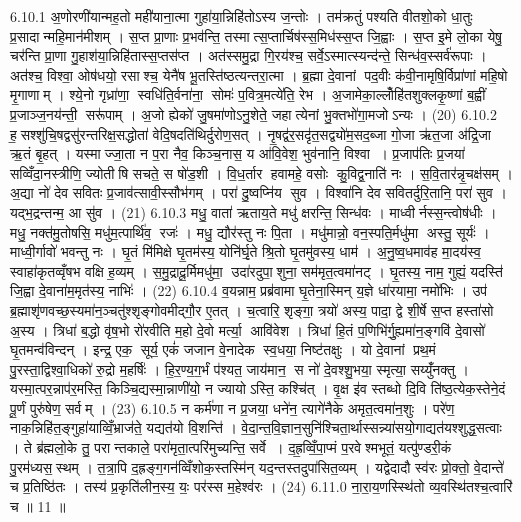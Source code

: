6.10.1
अ॒णोरणी॑यान्मह॒तो मही॑याना॒त्मा गुहा॑या॒न्निहि॑तोऽस्य ज॒न्तोः । तम॑क्रतुं पश्यति वीतशो॒को धा॒तुः प्र॒सादान्महि॒मान॑मीशम् । स॒प्त प्रा॒णाः प्र॒भव॑न्ति॒ तस्मात्स॒प्तार्चिष॑स्स॒मिध॑स्स॒प्त जि॒ह्वाः । स॒प्त इ॒मे लो॒का येषु॒ चर॑न्ति प्रा॒णा गु॒हाश॑या॒न्निहि॑तास्स॒प्तस॑प्त । अत॑स्समु॒द्रा गि॒रय॑श्च॒ सर्वे॒ऽस्मात्स्यन्द॑न्ते॒ सिन्ध॑व॒स्सर्व॑रूपाः । अत॑श्च॒ विश्वा॒ ओष॑धयो॒ रसाश्च॒ येनै॑ष भू॒तस्ति॑ष्ठत्यन्तरा॒त्मा । ब्र॒ह्मा दे॒वानां पद॒वीः क॑वी॒नामृषि॒र्विप्रा॑णां महि॒षो मृ॒गाणाम् । श्ये॒नो गृध्रा॑णा॒ स्वधि॑ति॒र्वना॑ना॒ सोमः॑ प॒वित्र॒मत्ये॑ति॒ रेभ\sn{} । अ॒जामेका॒ल्लोँहि॑तशुक्लकृ॒ष्णां ब॒ह्वीं प्र॒जाञ्ज॒नय॑न्ती॒ सरू॑पाम् । अ॒जो ह्येको॑ जु॒षमा॑णोऽनु॒शेते॒ जहात्येनां भु॒क्तभो॑गा॒मजोऽन्यः । (20)
6.10.2
ह॒सश्शु॑चि॒षद्वसु॑रन्तरिक्ष॒सद्धोता॑ वेदि॒षदति॑थिर्दुरोण॒सत् । नृ॒षद्व॑र॒सदृ॑त॒सद्व्यो॑म॒सद॒ब्जा गो॒जा ऋ॑त॒जा अ॑द्रि॒जा ऋ॒तं बृ॒हत् । यस्माज्जा॒ता न प॒रा नैव॒ किञ्च॒नास॒ य आ॑वि॒वेश॒ भुव॑नानि॒ विश्वा । प्र॒जाप॑तिः प्र॒जया॑ सव्विँदा॒नस्त्रीणि॒ ज्योतीषि सचते॒ स षो॑ड॒शी । वि॒ध॒र्तार हवामहे॒ वसोः कु॒विद्व॒नाति॑ नः । स॒वि॒तार॑न्नृ॒चक्ष॑सम् । अ॒द्या नो॑ देव सवितः प्र॒जाव॑त्सावी॒स्सौभ॑गम् । परा॑ दु॒ष्वप्नि॑य सुव । विश्वा॑नि देव सवितर्दुरि॒तानि॒ परा॑ सुव । यद्भ॒द्रन्तन्म॒ आ सु॑व । (21)
6.10.3
मधु॒ वाता॑ ऋताय॒ते मधु॑ क्षरन्ति॒ सिन्ध॑वः । माध्वीर्नस्स॒न्त्वोष॑धीः । मधु॒ नक्त॑मु॒तोषसि॒ मधु॑म॒त्पार्थि॑व॒ रजः॑ । मधु॒ द्यौर॑स्तु नः पि॒ता । मधु॑मान्नो॒ वन॒स्पति॒र्मधु॑मा अस्तु॒ सूर्यः॑ । माध्वी॒र्गावो॑ भवन्तु नः । घृ॒तं मि॑मिक्षे घृ॒तम॑स्य॒ योनि॑र्घृ॒ते श्रि॒तो घृ॒तमु॑वस्य॒ धाम॑ । अ॒नु॒ष्व॒धमाव॑ह मा॒दय॑स्व॒ स्वाहा॑कृतव्वृँषभ वक्षि ह॒व्यम् । स॒मु॒द्रादू॒र्मिमधु॑मा॒ उदा॑रदुपा॒शुना॒ सम॑मृत॒त्वमा॑नट् । घृ॒तस्य॒ नाम॒ गुह्यं॒ यदस्ति॑ जि॒ह्वा दे॒वाना॑म॒मृत॑स्य॒ नाभिः॑ । (22)
6.10.4
व॒यन्नाम॒ प्रब्र॑वामा घृ॒तेना॒स्मिन् य॒ज्ञे धा॑रयामा॒ नमो॑भिः । उप॑ ब्र॒ह्माशृ॑णवच्छ॒स्यमा॑न॒ञ्चतु॑श्शृङ्गोवमीद्गौ॒र ए॒तत् । च॒त्वारि॒ शृङ्गा॒ त्रयो॑ अस्य॒ पादा॒ द्वे शी॒र्\mbox{}षे स॒प्त हस्ता॑सो अ॒स्य । त्रिधा॑ ब॒द्धो वृ॑ष॒भो रो॑रवीति म॒हो दे॒वो मर्त्या॒ आवि॑वेश । त्रिधा॑ हि॒तं प॒णिभि॑र्गु॒ह्यमा॑न॒ङ्गवि॑ दे॒वासो॑ घृ॒तमन्व॑विन्दन् । इन्द्र॒ एक॒ सूर्य॒ एकं॑ जजान वे॒नादेक स्व॒धया॒ निष्ट॑तक्षुः । यो दे॒वानां प्रथ॒मं पु॒रस्ता॒द्विश्वा॒धिको॑ रु॒द्रो म॒हर्\mbox{}षिः॑ । हि॒र॒ण्य॒ग॒र्भं प॑श्यत॒ जाय॑मान॒ स नो॑ दे॒वश्शु॒भया॒ स्मृत्या॒ सय्युँ॑नक्तु । यस्मा॒त्पर॒न्नाप॑र॒मस्ति॒ किञ्चि॒द्यस्मा॒न्नाणी॑यो॒ न ज्यायोऽस्ति॒ कश्चि॑त् । वृ॒क्ष इ॑व स्तब्धो दि॒वि ति॑ष्ठ॒त्येक॒स्तेने॒दं पू॒र्णं पुरु॑षेण॒ सर्वम् । (23)
6.10.5
न कर्म॑णा न प्र॒जया॒ धने॑न॒ त्यागे॑नैके अमृत॒त्वमा॑न॒शुः । परे॑ण॒ नाक॒न्निहि॑त॒ङ्गुहा॑याव्विँ॒भ्राज॑ते॒ यद्यत॑यो वि॒शन्ति॑ । वे॒दा॒न्त॒वि॒ज्ञान॒सुनि॑श्चिता॒र्थास्सन्न्या॑सयो॒गाद्यत॑यश्शुद्ध॒सत्वाः । ते ब्र॑ह्मलो॒के तु॒ परान्तकाले॒ परा॑मृता॒त्परि॑मुच्यन्ति॒ सर्वे । द॒ह्र॒व्विँ॒पा॒प्मं प॒रवेश्मभूतं॒ यत्पु॑ण्डरी॒कं पु॒रम॑ध्यस॒स्थम् । त॒त्रा॒पि द॒ह्रङ्ग॒गन॑व्विँशोक॒स्तस्मि॑न् यद॒न्तस्तदुपा॑सित॒व्यम् । यद्वेदादौ स्व॑रः प्रो॒क्तो॒ वे॒दान्ते॑ च प्र॒तिष्ठि॑तः । तस्य॑ प्र॒कृति॑लीन॒स्य॒ यः॒ पर॑स्स म॒हेश्व॑रः । (24)
6.11.0
ना॒रा॒य॒णस्स्थि॑तो व्य॒वस्थि॑तश्च॒त्वारि॑ च ॥ 11 ॥
\anuvakamend

